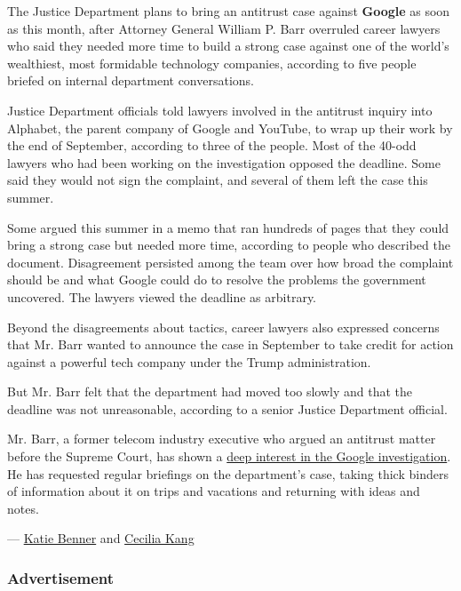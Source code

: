 The Justice Department plans to bring an antitrust case against
\textbf{Google} as soon as this month, after Attorney General William P.
Barr overruled career lawyers who said they needed more time to build a
strong case against one of the world's wealthiest, most formidable
technology companies, according to five people briefed on internal
department conversations.

Justice Department officials told lawyers involved in the antitrust
inquiry into Alphabet, the parent company of Google and YouTube, to wrap
up their work by the end of September, according to three of the people.
Most of the 40-odd lawyers who had been working on the investigation
opposed the deadline. Some said they would not sign the complaint, and
several of them left the case this summer.

Some argued this summer in a memo that ran hundreds of pages that they
could bring a strong case but needed more time, according to people who
described the document. Disagreement persisted among the team over how
broad the complaint should be and what Google could do to resolve the
problems the government uncovered. The lawyers viewed the deadline as
arbitrary.

Beyond the disagreements about tactics, career lawyers also expressed
concerns that Mr. Barr wanted to announce the case in September to take
credit for action against a powerful tech company under the Trump
administration.

But Mr. Barr felt that the department had moved too slowly and that the
deadline was not unreasonable, according to a senior Justice Department
official.

Mr. Barr, a former telecom industry executive who argued an antitrust
matter before the Supreme Court, has shown a
\href{https://www.nytimes3xbfgragh.onion/2020/06/25/technology/barr-google-investigation.html}{deep
interest in the Google investigation}. He has requested regular
briefings on the department's case, taking thick binders of information
about it on trips and vacations and returning with ideas and notes.

--- \href{https://www.nytimes3xbfgragh.onion/by/katie-benner}{Katie
Benner} and
\href{https://www.nytimes3xbfgragh.onion/by/cecilia-kang}{Cecilia Kang}

\hypertarget{advertisement-1}{%
\subsubsection{Advertisement}\label{advertisement-1}}

